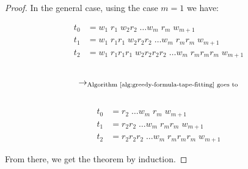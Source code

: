 \begin{proof}
    In the general case, using the case $m=1$ we have:
    \setlength{\columnsep}{-1.9cm}
    \begin{multicols}{3}
        \noindent
        \begin{align*}
            t_0 & = w_1\; r_1\; w_2 r_2\; \dots w_m\; r_m\; w_{m+1}                         \\
            t_1 & = w_1\; r_1r_1\; w_2 r_2 r_2\; \dots w_m\; r_m r_m\; w_{m+1}              \\
            t_2 & = w_1\; r_1 r_1 r_1\; w_2 r_2 r_2 r_2\; \dots w_m\; r_m r_m r_m\; w_{m+1}
        \end{align*}
        \begin{align*}
             &                                                                   \\
            \to_{\text{Algorithm~\ref{alg:greedy-formula-tape-fitting} goes to}} \\
             &
        \end{align*}
        \begin{align*}
            t_0 & = r_2\; \dots w_m\; r_m\; w_{m+1}                 \\
            t_1 & = r_2 r_2\; \dots w_m\; r_m r_m\; w_{m+1}         \\
            t_2 & = r_2 r_2 r_2\; \dots w_m\; r_m r_m r_m\; w_{m+1}
        \end{align*}
    \end{multicols}
    From there, we get the theorem by induction.





\end{proof}
